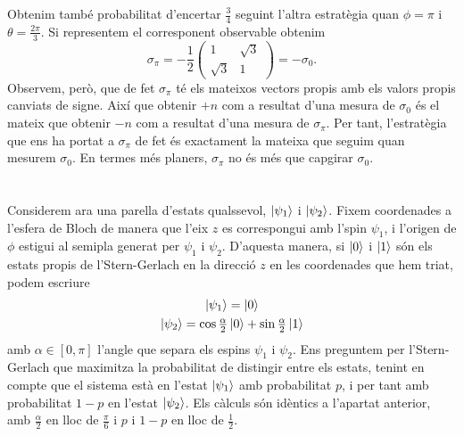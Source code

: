 \documentclass[12pt]{article}
\numberwithin{table}{section}
\numberwithin{figure}{section}
\numberwithin{equation}{section}
\begin{document}
Obtenim també probabilitat d'encertar \( \frac{3}{4} \) seguint l'altra estratègia quan \( \phi = \pi \) i \( \theta = \frac{2\pi}{3} \). Si representem el corresponent observable obtenim
\begin{equation*}
\sigma_\pi = -\frac{1}{2}\begin{pmatrix}
	1 & \sqrt{3} \\
	\sqrt{3} & 1
\end{pmatrix} = -\sigma_0.
\end{equation*}
Observem, però, que de fet \( \sigma_\pi \) té els mateixos vectors propis amb els valors propis canviats de signe. Així que obtenir \( +n \) com a resultat d'una mesura de \( \sigma_0 \) és el mateix que obtenir \( -n \) com a resultat d'una mesura de \( \sigma_\pi \). Per tant, l'estratègia que ens ha portat a \( \sigma_\pi \) de fet és exactament la mateixa que seguim quan mesurem \( \sigma_0 \). En termes més planers, \( \sigma_\pi \) no és més que capgirar \( \sigma_0 \). 

\section{}
Considerem ara una parella d'estats qualssevol, \( \ket{\psi_1} \) i \( \ket{\psi_2} \). Fixem coordenades a l'esfera de Bloch de manera que l'eix \( z \) es correspongui amb l'spin \( \psi_1 \), i l'origen de \( \phi \) estigui al semipla generat per \( \psi_1 \)	i \( \psi_2 \). D'aquesta manera, si \( \ket{0} \) i \( \ket{1} \) són els estats propis de l'Stern-Gerlach en la direcció \( z \) en les coordenades que hem triat, podem escriure
\begin{gather*}
\ket{\psi_1} = \ket{0} \\
\ket{\psi_2} = \cos{\tfrac{\alpha}{2}} \ket{0} + \sin{\tfrac{\alpha}{2}} \ket{1} 
\end{gather*}
amb \( \alpha \in [0, \pi] \) l'angle que separa els espins \( \psi_1 \) i \( \psi_2 \). Ens preguntem per l'Stern-Gerlach que maximitza la probabilitat de distingir entre els estats, tenint en compte que el sistema està en l'estat \( \ket{\psi_1} \) amb probabilitat \( p \), i per tant amb probabilitat \( 1 - p \) en l'estat \( \ket{\psi_2} \). Els càlculs són idèntics a l'apartat anterior, amb \( \frac{\alpha}{2} \) en lloc de \( \frac{\pi}{6} \) i \( p \) i \( 1 -p  \) en lloc de \( \frac{1}{2} \).
\end{document}
